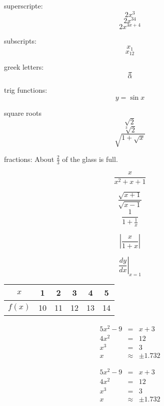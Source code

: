 \documentclass[UTF8]{ctexart}
\begin{document}
superscripte: $$2x^3$$
$$2x^{34}$$
$$2x^{3x+4}$$

subscripts:
$$x_1$$
$$x_{12}$$

greek letters:
$$\pi$$
$$\alpha$$

trig functions:
$$y=\sin{x}$$

square roots
$$\sqrt{2}$$
$$\sqrt[3]{2}$$
$$\sqrt{1+\sqrt{x}}$$

fractions:
About $\displaystyle{\frac{2}{3}}$ of the glass is full.

$$\frac{x}{x^2+x+1}$$

$$\frac{\sqrt{x+1}}{\sqrt{x-1}}$$
$$\frac{1}{1+\frac{1}{x}}$$

$$\left|\frac{x}{1+x}\right|$$

$$\left.\frac{dy}{dx}\right|_{x=1}$$

\begin{tabular}{c|ccccc}
\hline
$x$ & 1 &2&3&4&5 \\ \hline
$f(x)$ & 10 &11 &12 &13 &14 \\ \hline
\end{tabular}

\begin{eqnarray}
5x^2-9&=&x+3\\
4x^2&=&12\\
x^3&=&3\\
x&\approx&\pm1.732
\end{eqnarray}

\begin{eqnarray*}
5x^2-9&=&x+3\\
4x^2&=&12\\
x^3&=&3\\
x&\approx&\pm1.732
\end{eqnarray*}
\end{document}
